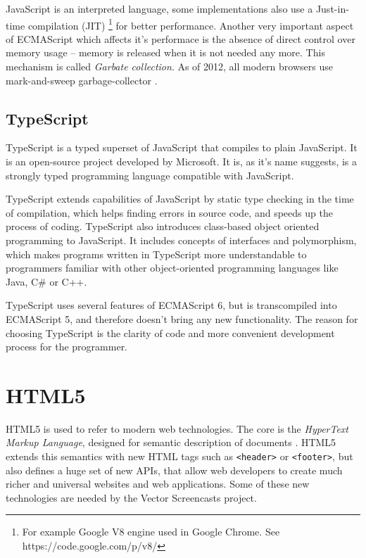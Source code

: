 JavaScript is an interpreted language, some implementations also use a Just-in-time compilation (JIT) \footnote{For example Google V8 engine used in Google Chrome. See https://code.google.com/p/v8/} for better performance.  Another very important aspect of ECMAScript which affects it's performace is the absence of direct control over memory usage -- memory is released when it is not needed any more. This mechanism is called \textit{Garbate collection}. As of 2012, all modern browsers use mark-and-sweep garbage-collector \cite{mdn_memmory_management}.

\subsection{TypeScript}
TypeScript is a typed superset of JavaScript that compiles to plain JavaScript\cite{typescript}. It is an open-source project developed by Microsoft. It is, as it's name suggests, is a strongly typed programming language compatible with JavaScript.

TypeScript extends capabilities of JavaScript by static type checking in the time of compilation, which helps finding errors in source code, and speeds up the process of coding. TypeScript also introduces class-based object oriented programming to JavaScript. It includes concepts of interfaces and polymorphism, which makes programs written in TypeScript more understandable to programmers familiar with other object-oriented programming languages like Java, C\# or C++.

TypeScript uses several features of ECMAScript 6, but is transcompiled into ECMAScript 5, and therefore doesn't bring any new functionality. The reason for choosing TypeScript is the clarity of code and more convenient development process for the programmer.








\section{HTML5}

HTML5 is used to refer to modern web technologies. The core is the \textit{HyperText Markup Language}, designed for semantic description of documents \cite{html5}. HTML5 extends this semantics with new HTML tags such as \verb|<header>| or \verb|<footer>|, but also defines a huge set of new APIs, that allow web developers to create much richer and universal websites and web applications. Some of these new technologies are needed by the Vector Screencasts project.

